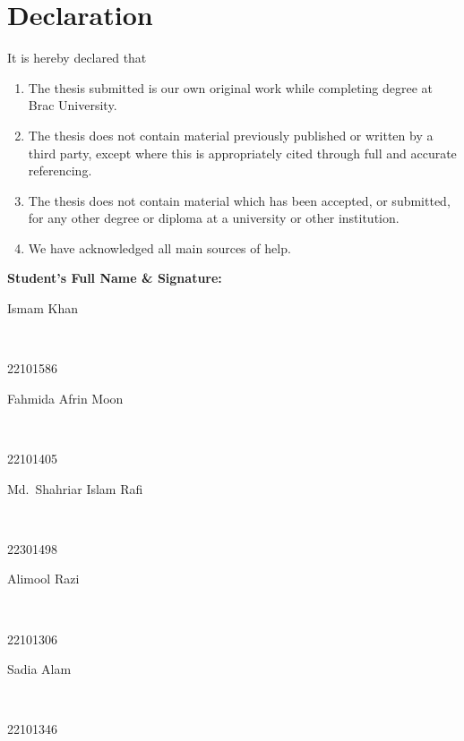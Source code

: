 \newcommand*\wildcard[2][6cm]{\vspace{2cm}\parbox{#1}{\hrulefill\par#2}}

\section*{Declaration}

It is hereby declared that

\begin{enumerate}
  \item The thesis submitted is our own original work while completing degree at Brac University.
  \item The thesis does not contain material previously published or written by a third party, except where this is appropriately cited through full and accurate referencing.
  \item The thesis does not contain material which has been accepted, or submitted, for any other degree or diploma at a university or other institution.
  \item We have acknowledged all main sources of help.
\end{enumerate}

\vspace{1cm}
\textbf{Student's Full Name \& Signature:}

\begingroup

    \begin{center}
        \wildcard{\centerline{Ismam Khan} ~\\ \centerline{22101586}}
        \hspace{2cm}
        \wildcard{\centerline{Fahmida Afrin Moon} ~\\ \centerline{22101405}}
        \wildcard{\centerline{Md.\ Shahriar Islam Rafi} ~\\ \centerline{22301498}}
        \hspace{2cm}
        \wildcard{\centerline{Alimool Razi} ~\\ \centerline{22101306}}
        \wildcard[13cm]{\centerline{Sadia Alam} ~\\ \centerline{22101346}}
    \end{center}

\endgroup

\pagebreak
